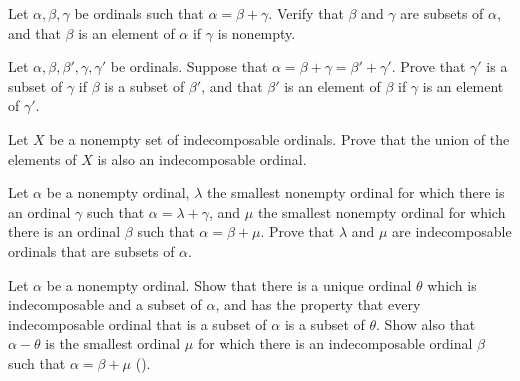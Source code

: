 \documentclass{article}
\begin{document}
\begin{exercise}
  \label{exe:v5ldoxkc}
  Let \(\alpha, \beta, \gamma\) be ordinals such that
  \(\alpha = \beta + \gamma\).  Verify that \(\beta\) and \(\gamma\)
  are subsets of \(\alpha\), and that \(\beta\) is an element of
  \(\alpha\) if \(\gamma\) is nonempty.
\end{exercise}

\begin{exercise}
  \label{exe:vwz0bksh}
  Let \(\alpha, \beta, \beta', \gamma, \gamma'\) be ordinals.  Suppose
  that \(\alpha = \beta + \gamma = \beta' + \gamma'\).  Prove that
  \(\gamma'\) is a subset of \(\gamma\) if \(\beta\) is a subset of
  \(\beta'\), and that \(\beta'\) is an element of \(\beta\) if
  \(\gamma\) is an element of \(\gamma'\).
\end{exercise}

\begin{exercise}
  \label{exe:6bo4uirh}
  Let \(X\) be a nonempty set of indecomposable ordinals.  Prove that
  the union of the elements of \(X\) is also an indecomposable
  ordinal.
\end{exercise}

\begin{exercise}
  \label{exe:vmlhobjb}
  Let \(\alpha\) be a nonempty ordinal, \(\lambda\) the smallest
  nonempty ordinal for which there is an ordinal \(\gamma\) such that
  \(\alpha = \lambda + \gamma\), and \(\mu\) the smallest nonempty
  ordinal for which there is an ordinal \(\beta\) such that
  \(\alpha = \beta + \mu\).  Prove that \(\lambda\) and \(\mu\) are
  indecomposable ordinals that are subsets of \(\alpha\).
\end{exercise}

\begin{exercise}
  \label{exe:726wa6d5}
  Let \(\alpha\) be a nonempty ordinal.  Show that there is a unique
  ordinal \(\theta\) which is indecomposable and a subset of
  \(\alpha\), and has the property that every indecomposable ordinal
  that is a subset of \(\alpha\) is a subset of \(\theta\).  Show also
  that \(\alpha - \theta\) is the smallest ordinal \(\mu\) for which
  there is an indecomposable ordinal \(\beta\) such that
  \(\alpha = \beta + \mu\) ().
\end{exercise}
\end{document}

